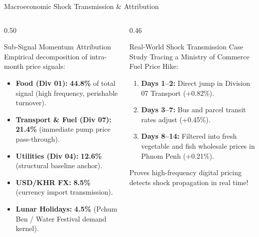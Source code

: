 \documentclass[aspectratio=169, 10pt]{beamer}
\begin{document}
\begin{frame}{Macroeconomic Shock Transmission \& Attribution}
  \begin{columns}
    \begin{column}{0.50\textwidth}
      \begin{block}{Sub-Signal Momentum Attribution}
        Empirical decomposition of intra-month price signals:
        \begin{itemize}
          \item \textbf{Food (Div 01):} \textbf{44.8\%} of total signal (high frequency, perishable turnover).
          \item \textbf{Transport \& Fuel (Div 07):} \textbf{21.4\%} (immediate pump price pass-through).
          \item \textbf{Utilities (Div 04):} \textbf{12.6\%} (structural baseline anchor).
          \item \textbf{USD/KHR FX:} \textbf{8.5\%} (currency import transmission).
          \item \textbf{Lunar Holidays:} \textbf{4.5\%} (Pchum Ben / Water Festival demand kernel).
        \end{itemize}
      \end{block}
    \end{column}

    \begin{column}{0.46\textwidth}
      \begin{exampleblock}{Real-World Shock Transmission Case Study}
        Tracing a Ministry of Commerce Fuel Price Hike:
        \begin{enumerate}
          \item \textbf{Days 1--2:} Direct jump in Division 07 Transport (+0.82\%).
          \item \textbf{Days 3--7:} Bus and parcel transit rates adjust (+0.45\%).
          \item \textbf{Days 8--14:} Filtered into fresh vegetable and fish wholesale prices in Phnom Penh (+0.21\%).
        \end{enumerate}
        Proves high-frequency digital pricing detects shock propagation in real time!
      \end{exampleblock}
    \end{column}
  \end{columns}
\end{frame}
\end{document}
